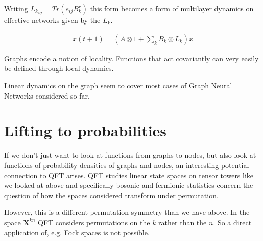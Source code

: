 \documentclass[reprint,twocolumn,amsmath,amssymb,aps]{revtex4-1}
\newcommand{\X}{\mathbf{X}}
\begin{document}
Writing ${L_k}_{ij} = Tr (e_{ij} B_k^r)$ this form becomes a form of multilayer dynamics on effective networks given by the $L_k$.

\begin{align}
x(t + 1) = \left( A \otimes 1 + \sum_k B_k \otimes L_k \right) x
\end{align}


Graphs encode a notion of locality. Functions that act covariantly can very easily be defined through local dynamics.

Linear dynamics on the graph seem to cover most cases of Graph Neural Networks considered so far.

\section{Lifting to probabilities}

If we don't just want to look at functions from graphs to nodes, but also look at functions of probability densities of graphs and nodes, an interesting potential connection to QFT arises. QFT studies linear state spaces on tensor towers like we looked at above and specifically bosonic and fermionic statistics concern the question of how the spaces considered transform under permutation.

However, this is a different permutation symmetry than we have above. In the space $\X^{kn}$ QFT considers permutations on the $k$ rather than the $n$. So a direct application of, e.g. Fock spaces is not possible.
%
%
%
%


\end{document}
